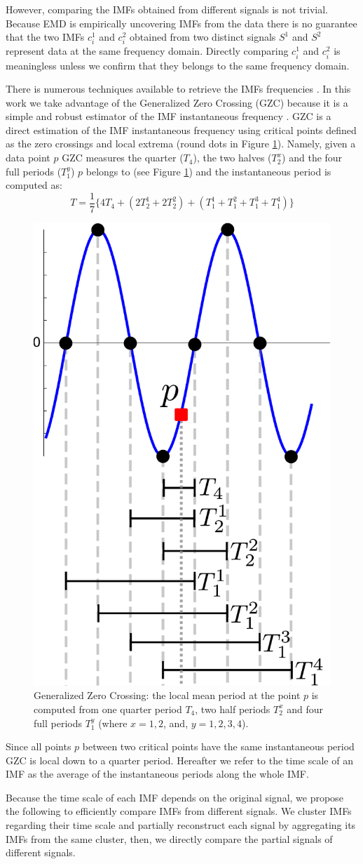 However, comparing the IMFs obtained from different signals is not trivial.
Because EMD is empirically uncovering IMFs from the data there is no guarantee that the two IMFs $c_i^1$ and $c_i^2$ obtained from two distinct signals $S^1$ and $S^2$ represent data at the same frequency domain.
Directly comparing $c_i^1$ and $c_i^2$ is meaningless unless we confirm that they belongs to the same frequency domain.

There is numerous techniques available to retrieve the IMFs frequencies \cite{huang:aada2009}.
In this work we take advantage of the Generalized Zero Crossing (GZC) \cite{huang:patent2006} because it is a simple and robust estimator of the IMF instantaneous frequency \cite{huang:aada2009}.
GZC is a direct estimation of the IMF instantaneous frequency using critical points defined as the zero crossings and local extrema (round dots in Figure \ref{fig:gzc}).
Namely, given a data point $p$ GZC measures the quarter ($T_4$), the two halves ($T_2^x$) and the four full periods ($T_1^y$) $p$  belongs to (see Figure \ref{fig:gzc}) and the instantaneous period is computed as:
\[T=\frac{1}{7}\{4T_4+(2T_2^1+2T_2^2)+(T_1^1+T_1^2+T_1^3+T_1^4)\}\]

\begin{figure}
\begin{center}
 \includegraphics[width=.25\textwidth]{img/gzc.pdf}
 \end{center}
 \caption{Generalized Zero Crossing: the local mean period at the point $p$ is computed from one quarter period $T_4$, two half periods $T_2^x$ and four full periods $T_1^y$ (where $x=1, 2$, and, $y=1,2,3,4$).}
 \label{fig:gzc}
\end{figure}

Since all points $p$ between two critical points have the same instantaneous period GZC is local down to a quarter period.
Hereafter we refer to the time scale of an IMF as the average of the instantaneous periods along the whole IMF.

Because the time scale of each IMF depends on the original signal, we propose the following to efficiently compare IMFs from different signals.
We cluster IMFs regarding their time scale and partially reconstruct each signal by aggregating its IMFs from the same cluster, then, we directly compare the partial signals of different signals.

